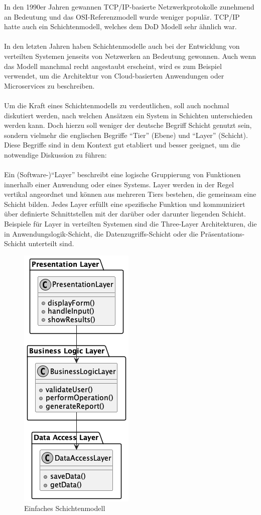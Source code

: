 \documentclass[../vs-script-first-v01.tex]{subfiles}
\begin{document}
In den 1990er Jahren gewannen TCP/IP-basierte Netzwerkprotokolle zunehmend an Bedeutung und das OSI-Referenzmodell wurde weniger populär. TCP/IP hatte auch ein Schichtenmodell, welches dem DoD Modell sehr ähnlich war. 
\\\\
In den letzten Jahren haben Schichtenmodelle auch bei der Entwicklung von verteilten Systemen jenseits von Netzwerken an Bedeutung gewonnen. Auch wenn das Modell manchmal recht angestaubt erscheint, wird es zum Beispiel verwendet, um die Architektur von Cloud-basierten Anwendungen oder Microservices zu beschreiben.
\\\\
Um die Kraft eines Schichtenmodells zu verdeutlichen, soll auch nochmal diskutiert werden, nach welchen Ansätzen ein System in Schichten unterschieden werden kann. Doch hierzu soll weniger der deutsche Begriff Schicht genutzt sein, sondern vielmehr  die englischen Begriffe \enquote{Tier} (Ebene) und \enquote{Layer} (Schicht). Diese Begriffe sind in dem Kontext gut etabliert und besser geeignet, um die notwendige Diskussion zu führen:
\\\\
Ein (Software-)\enquote{Layer} beschreibt eine logische Gruppierung von Funktionen innerhalb einer Anwendung oder eines Systems. Layer werden in der Regel vertikal angeordnet und können aus mehreren Tiers bestehen, die gemeinsam eine Schicht bilden. Jedes Layer erfüllt eine spezifische Funktion und  kommuniziert über definierte Schnittstellen mit der darüber oder darunter liegenden Schicht. Beispiele für Layer in verteilten Systemen sind die Three-Layer Architekturen, die in Anwendungslogik-Schicht, die Datenzugriffs-Schicht oder die Präsentations-Schicht unterteilt sind.
\begin{figure}[!h]
  \centering
  \includegraphics[width=0.25 \textwidth]{fig/uml/simple-layers.png}
  \caption{Einfaches Schichtenmodell}
  \label{fig:simple-layer}
\end{figure}
\end{document}
